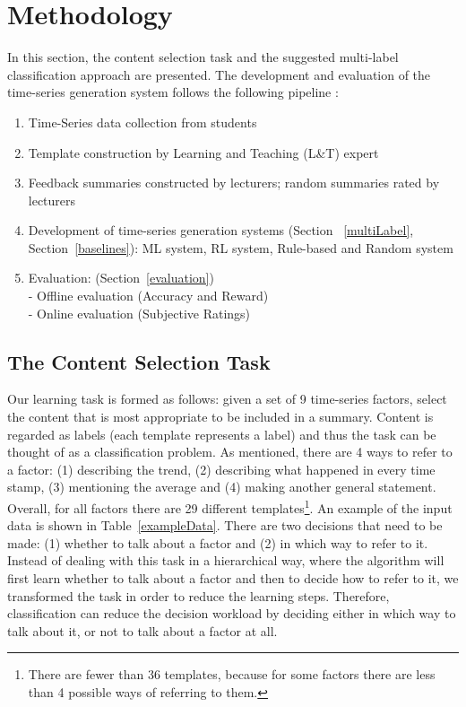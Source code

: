 \documentclass[11pt]{article}
\begin{document}
\section{Methodology} 
In this section, the content selection task and the suggested multi-label classification approach 
are presented. The development and evaluation of the time-series generation system 
follows the following pipeline \cite{Gkatzia2013}:
\begin{enumerate}
\item Time-Series data collection from students
\item Template construction by Learning and Teaching (L\&T) expert
\item Feedback summaries constructed by lecturers; random summaries rated by lecturers
\item Development of time-series generation systems (Section ~\ref{multiLabel}, Section~\ref{baselines}):
 ML system, RL system, Rule-based and Random system
\item Evaluation: (Section~\ref{evaluation}) \\
           - Offline evaluation (Accuracy and Reward)\\
					 - Online evaluation (Subjective Ratings)
\end{enumerate}

\subsection{The Content Selection Task}

Our learning task is formed as follows: given a set of 9 time-series factors, select the content that is 
most appropriate to be included in a summary. Content is regarded as labels (each template represents a label) 
and thus the task can be thought of as a classification problem. 
As mentioned, there are 4 ways to refer to a factor: 
(1) describing the trend, (2) describing what 
happened in every time stamp, (3) mentioning the average and (4) making 
another general statement. Overall, for all factors there are 29 different templates\footnote{There are fewer than 36 templates, 
because for some factors there are less than 4 possible ways of referring to them.}. An example of 
the input data is shown in Table~\ref{exampleData}. There are two decisions that need to be made: (1) 
whether to talk about a factor and (2) in which way to refer to it. 
Instead of dealing with this task in a hierarchical way, where the algorithm will first learn whether to talk 
about a factor and then to decide how to refer to it, we transformed the task in order to reduce 
the learning steps. Therefore, classification 
can reduce the decision workload by deciding either in which way to talk 
about it, or not to talk about a factor at all. 
\end{document}
